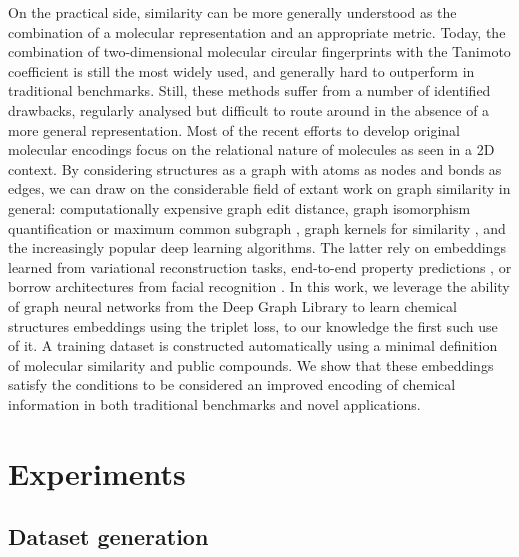 \documentclass[doublespacing]{bmcart}
\begin{document}
On the practical side, similarity can be more generally understood as the combination of a molecular representation and an appropriate metric\cite{maggiora2014molecular}. Today, the combination of two-dimensional molecular circular fingerprints \cite{cereto2015molecular, rogers2010extended} with the Tanimoto coefficient \cite{bajusz2015tanimoto} is still the most widely used, and  generally hard to outperform in traditional benchmarks\cite{raymond2002effectiveness}. Still, these methods suffer from a number of identified drawbacks, regularly analysed but difficult to route around in the absence of a more general representation\cite{flower1998properties, dixon1999hidden}. Most of the recent efforts to develop original molecular encodings focus on the relational nature of molecules as seen in a 2D context. By considering structures as a graph with atoms as nodes and bonds as edges, we can draw on the considerable field of extant work on graph similarity in general: computationally expensive graph edit distance, graph isomorphism quantification or maximum common subgraph \cite{garcia2019ligand, bunke1998graph, bunke1983inexact, dijkman2009graph, berretti2001efficient}, graph kernels for similarity \cite{kriege2020survey}, and the increasingly popular deep learning algorithms\cite{ma2021deep}. The latter rely on embeddings learned from variational reconstruction tasks\cite{jin2018junction}, end-to-end property predictions \cite{brown2009chemoinformatics}, or borrow architectures from facial recognition \cite{bai2019simgnn}.
In this work, we leverage  the ability of graph neural networks from the Deep Graph Library\cite{wang2019deep, li2021dgl} to learn chemical structures embeddings using the triplet loss\cite{schultz2004learning}, to our knowledge the first such use of it. A training dataset is constructed automatically using a minimal definition of molecular similarity and public compounds. We show that these embeddings satisfy the conditions to be considered an improved encoding of chemical information in both traditional benchmarks and novel applications.


\section*{Experiments}
\subsection*{Dataset generation}
\end{document}
